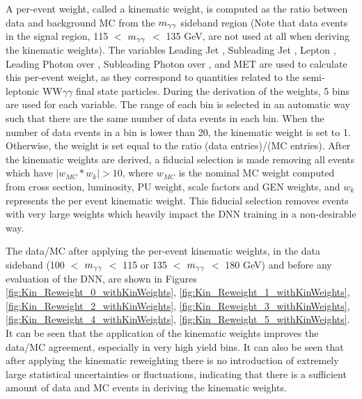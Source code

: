 A per-event weight, called a kinematic weight, is computed as the ratio between data and background MC from the $m_{\gamma\gamma}$ sideband region (Note that data events in the signal region, 115 $<$ $m_{\gamma\gamma}$ $<$ 135 GeV, are not used at all when deriving
the kinematic weights). The variables Leading Jet \pt, Subleading Jet \pt, Lepton \pt, 
Leading Photon \pt over \mgg, Subleading Photon \pt over \mgg, and MET are used to calculate this per-event weight, as they correspond to quantities related to the semi-leptonic WW$\gamma\gamma$ final state particles. During the derivation of the weights, 5 bins are used for each variable. The range of each 
bin is selected in an automatic way such that there are the same number of data events in each bin. When the number of data events in a bin is lower than 20, the kinematic weight is set to 1. Otherwise,
the weight is set equal to the ratio (data entries)/(MC entries). 
After the kinematic weights are derived, a fiducial selection is made removing all events 
which have $|w_{MC}*w_{k}| > 10$, where $w_{MC}$ is the nominal MC weight computed from cross section, luminosity, PU weight, scale factors and GEN weights, and $w_{k}$ represents the per event kinematic weight. 
This fiducial selection removes events with very large weights which heavily impact the DNN training in a non-desirable way. 

The data/MC after applying the per-event kinematic weights, in the data sideband (100 $<$ $m_{\gamma\gamma}$ $<$ 115 or 135 $<$ $m_{\gamma\gamma}$ $<$ 180 GeV) and before any evaluation of the DNN, are shown in Figures \ref{fig:Kin_Reweight_0_withKinWeights}, 
\ref{fig:Kin_Reweight_1_withKinWeights}, \ref{fig:Kin_Reweight_2_withKinWeights}, \ref{fig:Kin_Reweight_3_withKinWeights}, \ref{fig:Kin_Reweight_4_withKinWeights}, \ref{fig:Kin_Reweight_5_withKinWeights}. It can be 
seen that the application of the kinematic weights improves the data/MC agreement, especially in very high yield bins. It can also be seen that after applying the kinematic reweighting there is no 
introduction of extremely large statistical uncertainties or fluctuations, indicating that there is a sufficient amount of data and MC events in deriving the kinematic weights. 

\newpage 

